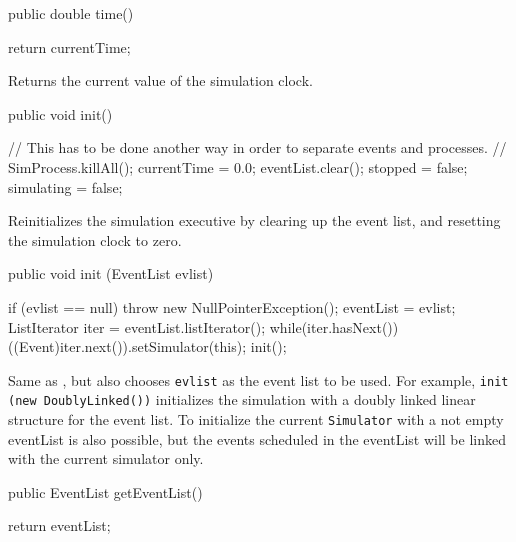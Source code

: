 \begin{code}

   public double time() \begin{hide}
   {
      return currentTime;
   }\end{hide}
\end{code}
   \begin{tabb} Returns the current value of the simulation clock. \end{tabb}
\begin{htmlonly}
\end{htmlonly}
\begin{code}

   public void init() \begin{hide} {
     // This has to be done another way in order to separate events and processes.
//      SimProcess.killAll();
      currentTime = 0.0;   eventList.clear();   stopped = false;  simulating = false;
   }\end{hide}
\end{code}
  \begin{tabb} Reinitializes the simulation executive by clearing up the event
   list, and resetting the simulation clock to zero.
  \end{tabb}
\begin{code}
 
   public void init (EventList evlist) \begin{hide} {
      if (evlist == null)
         throw new NullPointerException();
      eventList = evlist;
      ListIterator iter = eventList.listIterator();
      while(iter.hasNext())
         ((Event)iter.next()).setSimulator(this);
      init();
   }\end{hide}
\end{code}
  \begin{tabb} Same as , but also chooses \texttt{evlist} as the 
    event list to be used.
    For example, \texttt{init (new DoublyLinked())} initializes the simulation
    with a doubly linked linear structure for the event list. To initialize the
    current \texttt{Simulator} with a not empty eventList is also possible, but
    the events scheduled in the eventList will be linked with the current simulator only.
  \end{tabb}
\begin{htmlonly}
\end{htmlonly}
\begin{code}

   public EventList getEventList()\begin{hide} {
      return eventList;
   }\end{hide}
\end{code}
